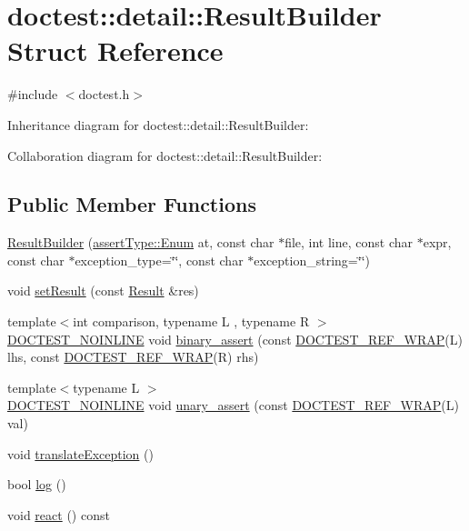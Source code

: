 \hypertarget{structdoctest_1_1detail_1_1_result_builder}{}\section{doctest\+:\+:detail\+:\+:Result\+Builder Struct Reference}
\label{structdoctest_1_1detail_1_1_result_builder}


{\ttfamily \#include $<$doctest.\+h$>$}



Inheritance diagram for doctest\+:\+:detail\+:\+:Result\+Builder\+:


Collaboration diagram for doctest\+:\+:detail\+:\+:Result\+Builder\+:
\subsection*{Public Member Functions}
\begin{DoxyCompactItemize}
\item 
\hyperlink{structdoctest_1_1detail_1_1_result_builder_af1af5a8d0991b4fe3548107f111e968d}{Result\+Builder} (\hyperlink{namespacedoctest_1_1assert_type_ae1bb5bed722f34f1c38b83cb19d326d3}{assert\+Type\+::\+Enum} at, const char $\ast$file, int line, const char $\ast$expr, const char $\ast$exception\+\_\+type=\char`\"{}\char`\"{}, const char $\ast$exception\+\_\+string=\char`\"{}\char`\"{})
\item 
void \hyperlink{structdoctest_1_1detail_1_1_result_builder_a86c0ca727fead43263de4a7e9a59ad23}{set\+Result} (const \hyperlink{structdoctest_1_1detail_1_1_result}{Result} \&res)
\item 
{\footnotesize template$<$int comparison, typename L , typename R $>$ }\\\hyperlink{doctest_8h_a47e9d3609dfcc90b9a630ff33b9524d6}{D\+O\+C\+T\+E\+S\+T\+\_\+\+N\+O\+I\+N\+L\+I\+NE} void \hyperlink{structdoctest_1_1detail_1_1_result_builder_ab3d55b158b3ae687f80bca94db6bb701}{binary\+\_\+assert} (const \hyperlink{doctest_8h_af2901cafb023c57fb672ccb1bf14f2eb}{D\+O\+C\+T\+E\+S\+T\+\_\+\+R\+E\+F\+\_\+\+W\+R\+AP}(L) lhs, const \hyperlink{doctest_8h_af2901cafb023c57fb672ccb1bf14f2eb}{D\+O\+C\+T\+E\+S\+T\+\_\+\+R\+E\+F\+\_\+\+W\+R\+AP}(R) rhs)
\item 
{\footnotesize template$<$typename L $>$ }\\\hyperlink{doctest_8h_a47e9d3609dfcc90b9a630ff33b9524d6}{D\+O\+C\+T\+E\+S\+T\+\_\+\+N\+O\+I\+N\+L\+I\+NE} void \hyperlink{structdoctest_1_1detail_1_1_result_builder_a98c33e90242e2859255a79cb38489f3b}{unary\+\_\+assert} (const \hyperlink{doctest_8h_af2901cafb023c57fb672ccb1bf14f2eb}{D\+O\+C\+T\+E\+S\+T\+\_\+\+R\+E\+F\+\_\+\+W\+R\+AP}(L) val)
\item 
void \hyperlink{structdoctest_1_1detail_1_1_result_builder_a5eece6aa3b1a2cb366cf5a0cc6c854a3}{translate\+Exception} ()
\item 
bool \hyperlink{structdoctest_1_1detail_1_1_result_builder_a2af75dd1d8db8d3aa949d78025854085}{log} ()
\item 
void \hyperlink{structdoctest_1_1detail_1_1_result_builder_a03686f862471728c2980d72e02980213}{react} () const
\end{DoxyCompactItemize}
